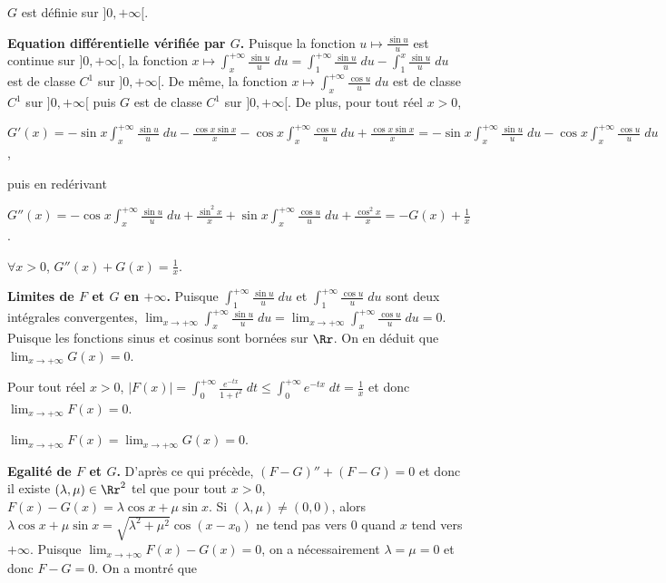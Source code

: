 {{\begin{center}
$G$ est définie sur $]0,+\infty[$.
\end{center}

\textbf{Equation différentielle vérifiée par $G$.}  Puisque la fonction $u\mapsto \frac{\sin u}{u}$ est continue sur $]0,+\infty[$, la fonction $x\mapsto\int_{x}^{+\infty} \frac{\sin u}{u}\;du=\int_{1}^{+\infty} \frac{\sin u}{u}\;du-\int_{1}^{x} \frac{\sin u}{u}\;du$ est de classe $C^1$ sur $]0,+\infty[$. De même, la fonction $x\mapsto\int_{x}^{+\infty} \frac{\cos u}{u}\;du$ est de classe $C^1$ sur $]0,+\infty[$ puis $G$ est de classe $C^1$ sur $]0,+\infty[$. De plus, pour tout réel $x>0$,

\begin{center}
$G'(x)=-\sin x\int_{x}^{+\infty} \frac{\sin u}{u}\;du- \frac{\cos x\sin x}{x}-\cos x\int_{x}^{+\infty} \frac{\cos u}{u}\;du+ \frac{\cos x\sin x}{x}=-\sin x\int_{x}^{+\infty} \frac{\sin u}{u}\;du-\cos x\int_{x}^{+\infty} \frac{\cos u}{u}\;du$,
\end{center}

puis en redérivant

\begin{center}
$G''(x)=-\cos x\int_{x}^{+\infty} \frac{\sin u}{u}\;du+ \frac{\sin^2x}{x}+\sin x\int_{x}^{+\infty} \frac{\cos u}{u}\;du+ \frac{\cos^2x}{x}=-G(x)+ \frac{1}{x}$.
\end{center}

\begin{center}
$\forall x>0$, $G''(x)+G(x)= \frac{1}{x}$.
\end{center}

\textbf{Limites de $F$ et $G$ en $+\infty$.} Puisque $\int_{1}^{+\infty} \frac{\sin u}{u}\;du$ et $\int_{1}^{+\infty} \frac{\cos u}{u}\;du$ sont deux intégrales convergentes, $\lim_{x \rightarrow +\infty}\int_{x}^{+\infty} \frac{\sin u}{u}\;du=\lim_{x \rightarrow +\infty}\int_{x}^{+\infty} \frac{\cos u}{u}\;du=0$. Puisque les fonctions sinus et cosinus sont bornées sur $\Rr$. On en déduit que $\lim_{x \rightarrow +\infty}G(x)=0$.

Pour tout réel $x>0$, $|F(x)|=\int_{0}^{+\infty} \frac{e^{-tx}}{1+t^2}\;dt\leqslant\int_{0}^{+\infty}e^{-tx}\;dt= \frac{1}{x}$ et donc $\lim_{x \rightarrow +\infty}F(x)=0$.

\begin{center}
$\lim_{x \rightarrow +\infty}F(x)=\lim_{x \rightarrow +\infty}G(x)=0$.
\end{center}

\textbf{Egalité de $F$ et $G$.} D'après ce qui précède, $(F-G)''+(F-G)=0$ et donc il existe $(\lambda,\mu)\in\Rr^2$ tel que pour tout $x>0$, $F(x)-G(x)=\lambda\cos x+\mu\sin x$. Si $(\lambda,\mu)\neq(0,0)$, alors $\lambda\cos x+\mu\sin x=\sqrt{\lambda^2+\mu^2}\cos(x-x_0)$ ne tend pas vers $0$ quand $x$ tend vers $+\infty$. Puisque $\lim_{x \rightarrow +\infty}F(x)-G(x)=0$, on a nécessairement $\lambda=\mu=0$ et donc $F-G=0$. On a montré que

}}
